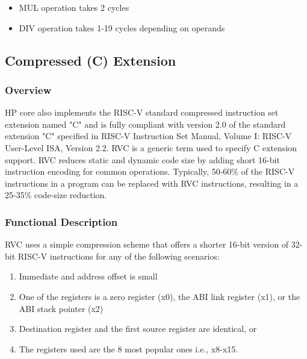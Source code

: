 \documentclass[main\_\_EN.tex]{subfiles}
\begin{document}
\begin{itemize}
    \item MUL operation takes 2 cycles
    \item DIV operation takes 1-19 cycles depending on operands
\end{itemize}


\subsection{Compressed (C) Extension}
\label{sec:riscvcpu-cext}

\subsubsection{Overview}
\label{sec:riscvcpu-cext-overview}

HP core also implements the RISC-V standard compressed instruction set extension named "C" and is fully compliant with version 2.0 of the standard extension "C" specified in RISC-V Instruction Set Manual, Volume I: RISC-V User-Level ISA, Version 2.2. RVC is a generic term used to specify C extension support. RVC reduces static and dynamic code size by adding short 16-bit instruction encoding for common operations. Typically, 50-60\% of the RISC-V instructions in a program can be replaced with RVC instructions, resulting in a 25-35\% code-size reduction.

\subsubsection{Functional Description}
\label{sec:riscvcpu-cext-func-descr}
RVC uses a simple compression scheme that offers a shorter 16-bit version of 32-bit RISC-V instructions for any of the following scenarios:
\begin{enumerate}
    \item Immediate and address offset is small
    \item One of the registers is a zero register (x0), the ABI link register (x1), or the ABI stack pointer (x2)
    \item Destination register and the first source register are identical, or
    \item The registers used are the 8 most popular ones i.e., x8-x15.
\end{enumerate}

\newpage

\end{document}
